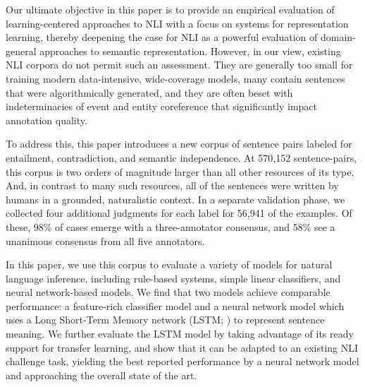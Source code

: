 Our ultimate objective in this paper is to provide an empirical
evaluation of learning-centered approaches to NLI with a focus on
systems for representation learning,
thereby deepening the case for NLI as a powerful evaluation of 
domain-general approaches to semantic representation. 
However, in our view, existing NLI corpora do not
permit such an assessment. They are generally too small for training
modern data-intensive, wide-coverage models, many contain sentences
that were algorithmically generated, and they are often beset with
indeterminacies of event and entity coreference that significantly
impact annotation quality.

To address this, this paper introduces a new corpus of sentence pairs labeled for
entailment, contradiction, and semantic independence. At 570,152
sentence-pairs, this corpus is two orders of magnitude larger than all
other resources of its type. And, in contrast to many such resources,
all of the sentences were written by humans in a grounded,
naturalistic context. In a separate validation phase, we collected
four additional judgments for each label for 56,941 of the examples.
Of these, 98\% of cases emerge with a three-annotator consensus, 
and 58\% see a unanimous consensus from all five annotators.

In this paper, we use this corpus to evaluate a variety of models
for natural language inference, including rule-based systems, simple
linear classifiers, and neural network-based models. 
We find that two models achieve comparable performance: a feature-rich
classifier model and a neural network model which uses a Long Short-Term Memory network (LSTM; 
\citealt{hochreiter1997long}) to represent sentence meaning. We further evaluate the LSTM model
by taking advantage of its ready support for transfer learning, and show that it can be adapted to an existing
NLI challenge task, yielding the best reported performance by a neural network model and approaching the overall state of the art.






